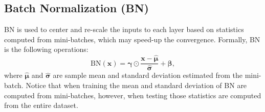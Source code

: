 \subsection{Batch Normalization (BN)}
    BN is used to center and re-scale the inputs to each layer based on statistics computed from mini-batches, which may speed-up the convergence.
    Formally, BN is the following operations:
        \begin{equation}
            \text{BN}(\bm{x}) = \bm{\gamma} \odot \frac{\bm{x} - \hat{\bm{\mu}} }{\hat{\bm{\sigma}}} + \bm{\beta},
        \end{equation}
    where $\hat{\bm{\mu}}$ and $\hat{\bm{\sigma}}$ are sample mean and standard deviation estimated from the mini-batch.
    Notice that when training the mean and standard deviation of BN are computed from mini-batches, however, when testing those statistics are computed from the entire dataset.
        
    